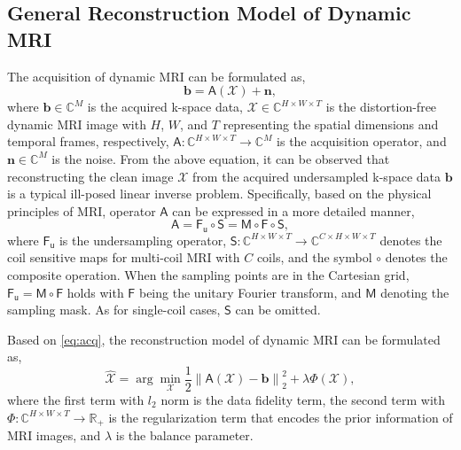 \subsection{General Reconstruction Model of Dynamic MRI}
The acquisition of dynamic MRI can be formulated as,
\begin{equation}
	\label{eq:acq}
	\mathbf{b} = \mathsf{A} (\mathcal{X}) + \mathbf{n},
\end{equation} 
where $\mathbf{b} \in \mathbb{C}^{M}$ is the acquired k-space data, $\mathcal{X} \in \mathbb{C}^{H \times W \times T}$ is the distortion-free dynamic MRI image with $H$, $W$, and $T$ representing the spatial dimensions and temporal frames, respectively, $\mathsf{A}: \mathbb{C}^{H \times W \times T} \rightarrow \mathbb{C}^{M}$ is the acquisition operator, and $\mathbf{n} \in \mathbb{C}^{M}$ is the noise. From the above equation, it can be observed that reconstructing the clean image $\mathcal{X}$ from the acquired undersampled k-space data $\mathbf{b}$ is a typical ill-posed linear inverse problem. Specifically, based on the physical principles of MRI, operator $\mathsf{A}$ can be expressed in a more detailed manner,
\begin{equation}
	\mathsf{A} = \mathsf{F_u} \circ \mathsf{S} = \mathsf{M} \circ \mathsf{F} \circ \mathsf{S},
\end{equation}
where $\mathsf{F_u}$ is the undersampling operator, $\mathsf{S}: \mathbb{C}^{H \times W \times T} \rightarrow \mathbb{C}^{C \times H \times W \times T}$ denotes the coil sensitive maps for multi-coil MRI with $C$ coils, and the symbol $\circ$ denotes the composite operation. When the sampling points are in the Cartesian grid, $\mathsf{F_u} = \mathsf{M} \circ \mathsf{F}$ holds with $\mathsf{F}$ being the unitary Fourier transform, and $\mathsf{M}$ denoting the sampling mask. As for single-coil cases, $\mathsf{S}$ can be omitted.

Based on \eqref{eq:acq}, the reconstruction model of dynamic MRI can be formulated as,
\begin{equation}
	\label{eq:rec}
	\hat{\mathcal{X}} = \arg \min_{\mathcal{X}} \frac{1}{2} \left\| \mathsf{A} (\mathcal{X}) - \mathbf{b} \right\|_2^2 + \lambda \mathsf{\Phi}(\mathcal{X}),
\end{equation}
where the first term with $l_2$ norm is the data fidelity term, the second term with $\mathsf{\Phi}: \mathbb{C}^{H \times W \times T} \rightarrow \mathbb{R}_+$ is the regularization term that encodes the prior information of MRI images, and $\lambda$ is the balance parameter.

